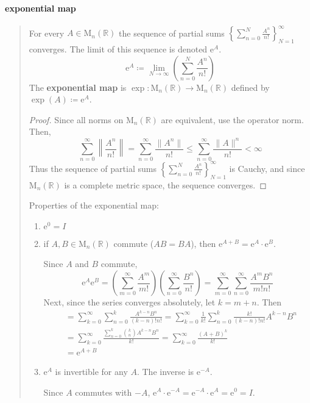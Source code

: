 \documentclass[letterpaper, 10pt]{article}
\theoremstyle{theostyle}
\begin{document}
\paragraph{exponential map}
\begin{quote}
    For every \(A \in \mathrm{M}_n (\mathbb{R})\) the sequence of partial sums 
    \( \displaystyle \left\{\sum_{n=0}^N \frac{A^n}{n!}\right\}_{N = 1}^{\infty}\) converges.
    The limit of this sequence is denoted \(\mathrm{e}^A\).
    \[\mathrm{e}^A \coloneqq \lim_{N \to \infty} \left(\sum_{n=0}^N \frac{A^n}{n!}\right)\]
    The \textbf{exponential map} is \(\exp : \mathrm{M}_n (\mathbb{R}) \rightarrow \mathrm{M}_n (\mathbb{R})\) defined by \(\exp(A) \coloneqq \mathrm{e}^A\).
    \begin{proof}
        Since all norms on \(\mathrm{M}_n ( \mathbb{R}) \) are equivalent, use the operator norm.
        Then,
        \[\sum_{n=0}^{\infty} \left\lVert \frac{A^n}{n!} \right\rVert = \sum_{n=0}^{\infty} \frac{\lVert A^n \rVert}{n!} \leq \sum_{n=0}^{\infty} \frac{\lVert A \rVert^n}{n!} < \infty\]
        Thus the sequence of partial sums \(\displaystyle \left\{\sum_{n=0}^N \frac{A^n}{n!}\right\}_{N = 1}^{\infty}\) is Cauchy, and since \(\mathrm{M}_n ( \mathbb{R}) \) is a complete metric space, the sequence converges.
    \end{proof}

    Properties of the exponential map:
    \begin{enumerate}
        \item \(\mathrm{e}^0 = I\)
        \item if \(A, B \in \mathrm{M}_n (\mathbb{R})\) commute (\(AB = BA\)), then \(\mathrm{e}^{A + B} = \mathrm{e}^A \cdot \mathrm{e}^B\).
        
        Since \(A\) and \(B\) commute,
        \[\mathrm{e}^A \mathrm{e}^B = \left(\sum_{m = 0}^\infty \frac{A^m}{m!}\right) \left(\sum_{n = 0}^\infty \frac{B^n}{n!}\right) = \sum_{m = 0}^\infty \sum_{n = 0}^\infty \frac{A^m B^n}{m! n!}\]
        Next, since the series converges absolutely, let \(k = m + n\).
        Then
        \begin{align*}
            &=\sum_{k = 0}^\infty \sum_{n = 0}^k \frac{A^{k-n} B^{n}}{(k-n)! n!} = \sum_{k = 0}^\infty \frac{1}{k!} \sum_{n = 0}^k \frac{k!}{(k-n)! n!} A^{k-n} B^{n} \\
            &= \sum_{k = 0}^\infty \frac{\displaystyle \sum_{n = 0}^k \binom{k}{n} A^{k-n} B^{n}}{k!} = \sum_{k = 0}^\infty \frac{(A + B)^k}{k!} \\
            &= \mathrm{e}^{A+B}
        \end{align*}
        \item \(\mathrm{e}^A\) is invertible for any \(A\).
        The inverse is \(\mathrm{e}^{-A}\).

        Since \(A\) commutes with \(-A\), \(\mathrm{e}^A \cdot \mathrm{e}^{-A} = \mathrm{e}^{-A} \cdot \mathrm{e}^{A} = \mathrm{e}^0 = I\).
    \end{enumerate}
\end{quote}
\end{document}
